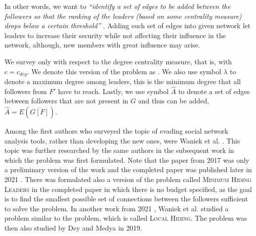 In other words, we want to \emph{``identify a set of edges to be added between the followers so that
the ranking of the leaders (based on some centrality measure) drops below a certain threshold''} \cite{Waniek2017}.
Adding such set of edges into given network let leaders to increase their security while not affecting their
influence in the network, although, new members with great influence may arise.

We survey \HLshort only with respect to the degree centrality measure, that is, with $c = c_{deg}$.
We denote this version of the problem as \HLdeg.
We also use symbol $\lambda$ to denote a maximum degree among leaders, this is the minimum degree that
all followers from $F'$ have to reach.
Lastly, we use symbol $\hat{A}$ to denote a set of edges between followers that are not present in $G$ and thus can be added,
$\hat{A} = E(\overline{G[F]})$.

Among the first authors who surveyed the topic of evading social network analysis tools, rather than developing the new ones,
were Waniek et al. \cite[y.~2016]{Waniek2016}.
This topic was further researched by the same authors in the subsequent work \cite[y.~2017]{Waniek2017}
in which the \HL problem was first formulated.
Note that the paper from 2017 was only a preliminary version of the work and the completed paper was
published later in 2021 \cite[y.~2021]{Waniek2021full}.
There was formulated also a version of the \HL problem called \textsc{Minimum Hiding Leaders} in the completed paper
in which there is no budget specified, as the goal is to find the smallest possible set of connections between the followers
sufficient to solve the problem.
In another work from 2021 \cite{Waniek2021}, Waniek et al. studied a problem similar to the \HL problem,
which is called \textsc{Local Hiding}.
The \HL problem was then also studied by Dey and Medya \cite{Dey2019} in 2019.


